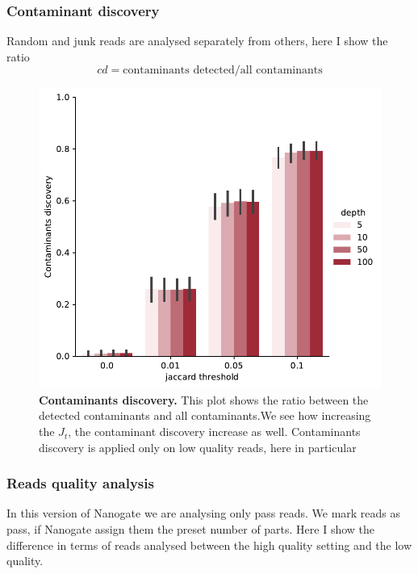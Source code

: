 \documentclass[11pt, a4paper]{article}
\begin{document}
\subsubsection{Contaminant discovery}
Random and junk reads are analysed separately from others, here I show the ratio
\begin{equation}
    cd = \mbox{contaminants detected}/ \mbox{all contaminants}
\end{equation}

 \begin{figure}[ht]
    \begin{center}
    \includegraphics[width=1.35\textwidth]{../results/images_notebook/v_460/lq_sim_70_contaminant_discovery.pdf}
    \end{center}
    \caption{{\bf Contaminants discovery.}  This plot shows the ratio between the detected contaminants and all contaminants.We see how increasing the $J_t$, the contaminant discovery increase as well. Contaminants discovery is applied only on low quality reads, here in particular  }
   \label{fig:v_460_sim_70_contaminant_discovery}
\end{figure}
\clearpage
\subsubsection{Reads quality analysis}
In this version of Nanogate we are analysing only pass reads. We mark reads as pass, if Nanogate assign them the preset number of parts. Here I show the difference in terms of reads analysed between the high quality setting and the low quality.
\end{document}
